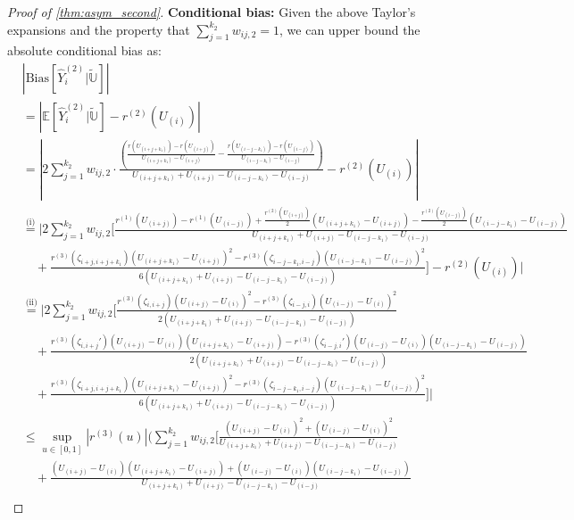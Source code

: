 \documentclass{uwstat572}
\theoremstyle{definition}
\renewcommand{\hat}{\widehat}
\renewcommand{\tilde}{\widetilde}
\theoremstyle{theorem}
\begin{document}
\begin{proof}[Proof of \autoref{thm:asym_second}]
{\bf Conditional bias:} Given the above Taylor's expansions and the property that $\sum_{j=1}^{k_2} w_{ij,2}=1$, we can upper bound the absolute conditional bias as:
\begin{align*}
&\left|\mathrm{Bias}\left[\hat{Y}_i^{(2)}\big| \tilde{\mathbb{U}}\right]\right| \\
&= \left|\mathbb{E}\left[\hat{Y}_i^{(2)}\big| \tilde{\mathbb{U}} \right] - r^{(2)}(U_{(i)}) \right|\\
&= \left|2\sum_{j=1}^{k_2} w_{ij,2} \cdot \frac{\left(\frac{r(U_{(i+j+k_1)}) -r(U_{(i+j)})}{U_{(i+j+k_1)} - U_{(i+j)}} - \frac{r(U_{(i-j-k_1)}) -r(U_{(i-j)})}{U_{(i-j-k_1)} - U_{(i-j)}} \right)}{U_{(i+j+k_1)} + U_{(i+j)} - U_{(i-j-k_1)} -U_{(i-j)}} - r^{(2)}(U_{(i)})\right|\\
&\stackrel{\text{(i)}}{=} \Bigg|2\sum_{j=1}^{k_2} w_{ij,2} \Bigg[\frac{r^{(1)}(U_{(i+j)}) - r^{(1)}(U_{(i-j)}) + \frac{r^{(2)}(U_{(i+j)})}{2}\left(U_{(i+j+k_1)} - U_{(i+j)}\right) - \frac{r^{(2)}(U_{(i-j)})}{2}\left(U_{(i-j-k_1)} - U_{(i-j)}\right)}{U_{(i+j+k_1)} + U_{(i+j)} - U_{(i-j-k_1)} -U_{(i-j)}}\\
&\quad + \frac{r^{(3)}(\zeta_{i+j,i+j+k_1})\left(U_{(i+j+k_1)} -U_{(i+j)}\right)^2 - r^{(3)}(\zeta_{i-j-k_1,i-j})\left(U_{(i-j-k_1)} -U_{(i-j)}\right)^2}{6\left(U_{(i+j+k_1)} + U_{(i+j)} - U_{(i-j-k_1)} -U_{(i-j)}\right)} \Bigg] - r^{(2)}(U_{(i)})\Bigg|\\
&\stackrel{\text{(ii)}}{=} \Bigg|2 \sum_{j=1}^{k_2} w_{ij,2} \Bigg[\frac{r^{(3)}(\zeta_{i,i+j})\left(U_{(i+j)} -U_{(i)}\right)^2 - r^{(3)}(\zeta_{i-j,i})\left(U_{(i-j)} -U_{(i)}\right)^2 }{2\left(U_{(i+j+k_1)} + U_{(i+j)} - U_{(i-j-k_1)} -U_{(i-j)}\right)} \\
&\quad +\frac{r^{(3)}(\zeta_{i,i+j}')\left(U_{(i+j)} -U_{(i)} \right) \left(U_{(i+j+k_1)} -U_{(i+j)}\right) - r^{(3)}(\zeta_{i-j,i}')\left(U_{(i-j)} -U_{(i)} \right) \left(U_{(i-j-k_1)} -U_{(i-j)}\right)}{2\left(U_{(i+j+k_1)} + U_{(i+j)} - U_{(i-j-k_1)} -U_{(i-j)}\right)}\\
&\quad + \frac{r^{(3)}(\zeta_{i+j,i+j+k_1})\left(U_{(i+j+k_1)} -U_{(i+j)}\right)^2 - r^{(3)}(\zeta_{i-j-k_1,i-j})\left(U_{(i-j-k_1)} -U_{(i-j)}\right)^2}{6\left(U_{(i+j+k_1)} + U_{(i+j)} - U_{(i-j-k_1)} -U_{(i-j)}\right)}\Bigg] \Bigg|\\
&\leq \sup_{u\in [0,1]}\left|r^{(3)}(u) \right| \Bigg(\sum_{j=1}^{k_2} w_{ij,2} \Bigg[ \frac{\left(U_{(i+j)} -U_{(i)}\right)^2 + \left(U_{(i-j)} -U_{(i)}\right)^2}{U_{(i+j+k_1)} + U_{(i+j)} - U_{(i-j-k_1)} -U_{(i-j)}} \\
&\quad + \frac{(U_{(i+j)}-U_{(i)})(U_{(i+j+k_1)} - U_{(i+j)}) + (U_{(i-j)} -U_{(i)})(U_{(i-j-k_1)}-U_{(i-j)})}{U_{(i+j+k_1)} + U_{(i+j)} - U_{(i-j-k_1)} -U_{(i-j)}} \\

\end{align*}
\end{proof}
\end{document}
